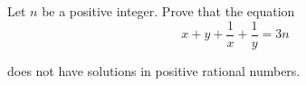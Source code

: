 Let $n$ be a positive integer. Prove that the equation\[x+y+\frac{1}{x}+\frac{1}{y}=3n\]

does not have solutions in positive rational numbers.